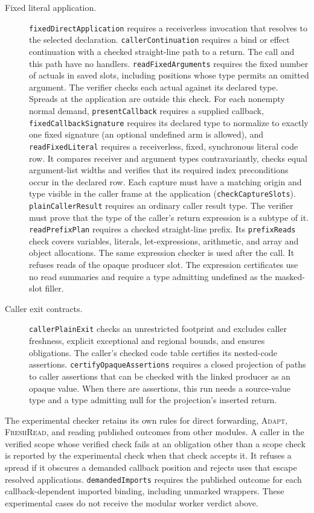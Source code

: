 \documentclass[10pt,a4paper]{article}
\newcommand{\ruleName}[1]{\textcolor{rulec}{\textsc{#1}}}
\theoremstyle{definition}
\newcommand{\lean}[1]{\textcolor{leanc}{\texttt{\small #1}}}
\newcommand{\scopecheck}[1]{\lean{#1}}
\begin{document}
\begin{description}
\item[Fixed literal application.] \scopecheck{fixedDirectApplication}
requires a receiverless invocation that resolves to the selected
declaration. \scopecheck{callerContinuation} requires a bind or effect
continuation with a checked straight-line path to a return. The call and
this path have no handlers. \scopecheck{readFixedArguments}
requires the fixed number of actuals in saved slots, including positions
whose type permits an omitted argument. The verifier checks each actual
against its declared type. Spreads at the application are outside this
check. For each nonempty normal demand, \scopecheck{presentCallback}
requires a supplied callback, \scopecheck{fixedCallbackSignature}
requires its declared type to normalize to exactly one fixed signature
(an optional undefined arm is allowed), and \scopecheck{readFixedLiteral}
requires a receiverless, fixed, synchronous literal code row. It
compares receiver and argument types contravariantly,
checks equal argument-list widths and verifies that its required index
preconditions occur in the declared row. Each capture must have a
matching origin and type visible in the caller frame at the application
(\lean{checkCaptureSlots}).
\scopecheck{plainCallerResult} requires an ordinary caller result
type. The verifier must prove that the type of the caller's return
expression is a subtype of it.
\scopecheck{readPrefixPlan} requires a checked straight-line prefix. Its
\lean{prefixReads} check covers variables, literals, let-expressions,
arithmetic, and array and object allocations. The same expression
checker is used after the call. It refuses reads of the opaque
producer slot. The expression certificates use no read summaries and
require a type admitting undefined as the masked-slot filler.

\item[Caller exit contracts.] \scopecheck{callerPlainExit} checks an
unrestricted footprint and excludes caller freshness, explicit exceptional
and regional bounds, and ensures obligations. The caller's checked
code table certifies its nested-code assertions. \lean{certifyOpaqueAssertions}
requires a closed projection of paths to caller assertions that can be
checked with the linked producer as an opaque value. When there are
assertions, this run needs a source-value type and a type admitting null
for the projection's inserted return.
\end{description}

The experimental checker retains its own rules for direct forwarding,
\ruleName{Adapt}, \ruleName{FreshRead}, and reading published outcomes
from other modules. A caller in the verified scope whose verified check
fails at an obligation other than a scope check is reported by the
experimental check when that check accepts it. It refuses a
spread if it obscures a demanded callback position and rejects uses
that escape resolved applications. \lean{demandedImports} requires the
published outcome for each callback-dependent imported binding, including
unmarked wrappers. These experimental cases do not receive the modular
worker verdict above.
\end{document}
